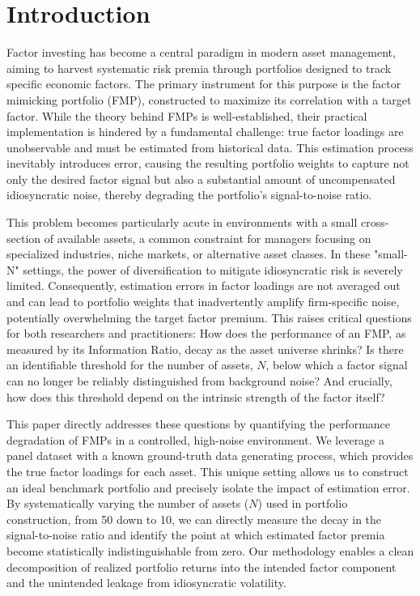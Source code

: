 \documentclass[]{article}
\begin{document}
\section{Introduction}
\label{sec:intro}
Factor investing has become a central paradigm in modern asset management, aiming to harvest systematic risk premia through portfolios designed to track specific economic factors. The primary instrument for this purpose is the factor mimicking portfolio (FMP), constructed to maximize its correlation with a target factor. While the theory behind FMPs is well-established, their practical implementation is hindered by a fundamental challenge: true factor loadings are unobservable and must be estimated from historical data. This estimation process inevitably introduces error, causing the resulting portfolio weights to capture not only the desired factor signal but also a substantial amount of uncompensated idiosyncratic noise, thereby degrading the portfolio's signal-to-noise ratio.

This problem becomes particularly acute in environments with a small cross-section of available assets, a common constraint for managers focusing on specialized industries, niche markets, or alternative asset classes. In these "small-N" settings, the power of diversification to mitigate idiosyncratic risk is severely limited. Consequently, estimation errors in factor loadings are not averaged out and can lead to portfolio weights that inadvertently amplify firm-specific noise, potentially overwhelming the target factor premium. This raises critical questions for both researchers and practitioners: How does the performance of an FMP, as measured by its Information Ratio, decay as the asset universe shrinks? Is there an identifiable threshold for the number of assets, $N$, below which a factor signal can no longer be reliably distinguished from background noise? And crucially, how does this threshold depend on the intrinsic strength of the factor itself?

This paper directly addresses these questions by quantifying the performance degradation of FMPs in a controlled, high-noise environment. We leverage a panel dataset with a known ground-truth data generating process, which provides the true factor loadings for each asset. This unique setting allows us to construct an ideal benchmark portfolio and precisely isolate the impact of estimation error. By systematically varying the number of assets ($N$) used in portfolio construction, from 50 down to 10, we can directly measure the decay in the signal-to-noise ratio and identify the point at which estimated factor premia become statistically indistinguishable from zero. Our methodology enables a clean decomposition of realized portfolio returns into the intended factor component and the unintended leakage from idiosyncratic volatility.
\end{document}
